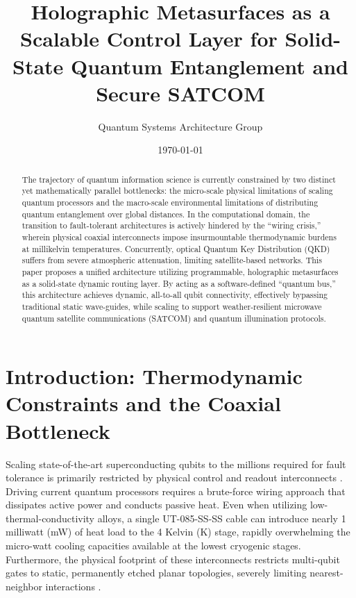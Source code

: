 \documentclass[11pt, a4paper]{article}
\begin{document}
\title{\textbf{Holographic Metasurfaces as a Scalable Control Layer for Solid-State Quantum Entanglement and Secure SATCOM}}
\author{Quantum Systems Architecture Group}
\date{\today}
\maketitle

\begin{abstract}
The trajectory of quantum information science is currently constrained by two distinct yet mathematically parallel bottlenecks: the micro-scale physical limitations of scaling quantum processors and the macro-scale environmental limitations of distributing quantum entanglement over global distances. In the computational domain, the transition to fault-tolerant architectures is actively hindered by the ``wiring crisis,'' wherein physical coaxial interconnects impose insurmountable thermodynamic burdens at millikelvin temperatures. Concurrently, optical Quantum Key Distribution (QKD) suffers from severe atmospheric attenuation, limiting satellite-based networks. This paper proposes a unified architecture utilizing programmable, holographic metasurfaces as a solid-state dynamic routing layer. By acting as a software-defined ``quantum bus,'' this architecture achieves dynamic, all-to-all qubit connectivity, effectively bypassing traditional static wave-guides, while scaling to support weather-resilient microwave quantum satellite communications (SATCOM) and quantum illumination protocols.
\end{abstract}

\vspace{0.5cm}

\section{Introduction: Thermodynamic Constraints and the Coaxial Bottleneck}
Scaling state-of-the-art superconducting qubits to the millions required for fault tolerance is primarily restricted by physical control and readout interconnects \cite{whitepaper_main}. Driving current quantum processors requires a brute-force wiring approach that dissipates active power and conducts passive heat. Even when utilizing low-thermal-conductivity alloys, a single UT-085-SS-SS cable can introduce nearly 1 milliwatt (mW) of heat load to the 4 Kelvin (K) stage, rapidly overwhelming the micro-watt cooling capacities available at the lowest cryogenic stages. Furthermore, the physical footprint of these interconnects restricts multi-qubit gates to static, permanently etched planar topologies, severely limiting nearest-neighbor interactions \cite{cryo_arch}.
\end{document}
